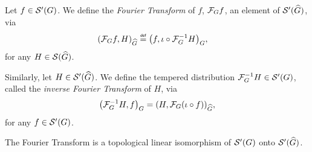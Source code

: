 \begin{definition}
    Let $f \in \TemperedDistributions\Group$.
    We define the \emph{Fourier Transform} of $f$, $\Fourier f$,
    an element of $\TemperedDistributions{\dualGroup\Group}$, via
    \begin{align*}
        \ip[\dualGroup\Group]{\Fourier f}{H}
        \defeq \ip[\Group]{f}{\iota \circ \InverseFourier H},\quad
    \end{align*}
    for any $H \in \Schwartz{\dualGroup\Group}$.

    Similarly, let $H \in \TemperedDistributions{\dualGroup\Group}$.
    We define the tempered distribution $\InverseFourier H \in \TemperedDistributions\Group$,
    called the \emph{inverse Fourier Transform} of $H$, via
    \begin{align*}
        \ip[\Group]{\InverseFourier H}{f}
        = \ip[\dualGroup\Group]{H}{\Fourier (\iota \circ f)},
    \end{align*}
    for any $f \in \TemperedDistributions\Group$.
\end{definition}

\begin{proposition}
    The Fourier Transform is a topological linear isomorphism
    of $\TemperedDistributions\Group$ onto $\TemperedDistributions{\dualGroup\Group}$.
\end{proposition}

